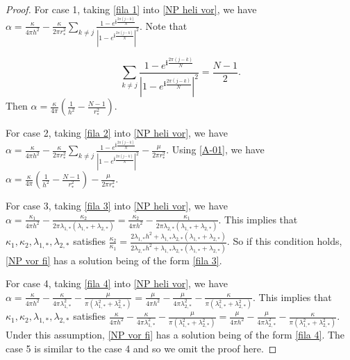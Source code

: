 \documentclass[12pt,reqno]{amsart}
\numberwithin{equation}{section}
\theoremstyle{definition}
\theoremstyle{remark}
\newtheorem{remark}[theorem]{Remark}
\begin{document}
\begin{proof}
For case 1, taking \eqref{fila 1} into \eqref{NP heli vor}, we have $ \alpha=\frac{\kappa}{4\pi h^2}-\frac{\kappa}{2\pi r_*^2}\sum_{k\neq j}\frac{1-e^{\mathbf{i}\frac{2\pi(j-k)}{N}}}{|1-e^{\mathbf{i}\frac{2\pi(j-k)}{N}}|^2} $.  Note that

\begin{equation}\label{A-01}
\sum_{k\neq j}\frac{1-e^{\mathbf{i}\frac{2\pi(j-k)}{N}}}{|1-e^{\mathbf{i}\frac{2\pi(j-k)}{N}}|^2}=\frac{N-1}{2}.
\end{equation} 
Then $ \alpha=\frac{\kappa}{4\pi}\left( \frac{1}{h^2}-\frac{N-1}{r_*^2}\right). $

For case 2, taking \eqref{fila 2} into \eqref{NP heli vor}, we have $ \alpha=\frac{\kappa}{4\pi h^2}-\frac{\kappa}{2\pi r_*^2}\sum_{k\neq j}\frac{1-e^{\mathbf{i}\frac{2\pi(j-k)}{N}}}{|1-e^{\mathbf{i}\frac{2\pi(j-k)}{N}}|^2}-\frac{\mu}{2\pi r_*^2} $. Using \eqref{A-01}, we have $ \alpha=\frac{\kappa}{4\pi}\left( \frac{1}{h^2}-\frac{N-1}{r_*^2}\right)-\frac{\mu}{2\pi r_*^2}  $.

For case 3, taking \eqref{fila 3} into \eqref{NP heli vor}, we have $ \alpha=\frac{\kappa_1}{4\pi h^2}  -\frac{\kappa_2}{2\pi \lambda_{1,*}(\lambda_{1,*}+\lambda_{2,*})}=\frac{\kappa_2}{4\pi h^2}  -\frac{\kappa_1}{2\pi \lambda_{2,*}(\lambda_{1,*}+\lambda_{2,*})}  $. This implies that $ \kappa_1,\kappa_2,  \lambda_{1,*},\lambda_{2,*}  $  satisfies $ 	\frac{\kappa_2}{\kappa_1}=\frac{2\lambda_{1,*}h^2+\lambda_{1,*}\lambda_{2,*}(\lambda_{1,*}+\lambda_{2,*})}{2\lambda_{2,*}h^2+\lambda_{1,*}\lambda_{2,*}(\lambda_{1,*}+\lambda_{2,*})} $. So if this condition holds, \eqref{NP vor fi} has a solution being of the form \eqref{fila 3}.

For case 4, taking \eqref{fila 4} into \eqref{NP heli vor}, we have $ \alpha=\frac{\kappa}{4\pi h^2} -\frac{\kappa}{4\pi \lambda_{1,*}^2} -\frac{\mu}{\pi \left (\lambda_{1,*}^2+\lambda_{2,*}^2\right )}=\frac{\mu}{4\pi h^2} -\frac{\mu}{4\pi \lambda_{2,*}^2} -\frac{\kappa}{\pi \left (\lambda_{1,*}^2+\lambda_{2,*}^2\right )}  $. This implies that $ \kappa_1,\kappa_2,  \lambda_{1,*},\lambda_{2,*}  $  satisfies $\frac{\kappa}{4\pi h^2} -\frac{\kappa}{4\pi \lambda_{1,*}^2} -\frac{\mu}{\pi \left (\lambda_{1,*}^2+\lambda_{2,*}^2\right )}=\frac{\mu}{4\pi h^2} -\frac{\mu}{4\pi \lambda_{2,*}^2} -\frac{\kappa}{\pi \left (\lambda_{1,*}^2+\lambda_{2,*}^2\right )} $. Under this assumption, \eqref{NP vor fi} has a solution being of the form \eqref{fila 4}. The case 5 is similar to the case 4 and so we omit the proof here.  
\end{proof}
\end{document}
